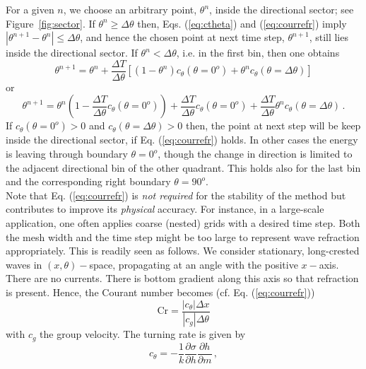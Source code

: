 \documentclass[12pt]{book}
\begin{document}
For a given $n$, we choose an arbitrary point, $\theta^n$, inside the directional sector; see Figure~\ref{fig:sector}.
If $\theta^n \geq \Delta \theta$ then, Eqs. (\ref{eq:ctheta}) and (\ref{eq:courrefr}) imply
$|\theta^{n+1}-\theta^n| \leq \Delta \theta$, and hence the chosen point at next time step, $\theta^{n+1}$, still lies inside the directional sector. If $\theta^n < \Delta \theta$, i.e. in the first bin, then one obtains
\begin{equation}
  \theta^{n+1} = \theta^n + \frac{\Delta T}{\Delta \theta} \left[ (1-\theta^n) c_\theta(\theta=0^o) + \theta^n c_\theta(\theta=\Delta \theta) \right]
\end{equation}
or
\begin{equation}
  \theta^{n+1} = \theta^n \left ( 1 - \frac{\Delta T}{\Delta \theta} c_\theta(\theta=0^o) \right ) + \frac{\Delta T}{\Delta \theta} c_\theta(\theta=0^o) + \frac{\Delta T}{\Delta \theta}
  \theta^n c_\theta(\theta=\Delta \theta) \, .
\end{equation}
If $c_\theta(\theta=0^o) > 0$ and $c_\theta(\theta=\Delta \theta) > 0$ then, the point at next step will be keep inside the directional sector, if Eq. (\ref{eq:courrefr}) holds. In other cases the energy is leaving
through boundary $\theta = 0^o$, though the change in direction is limited to the adjacent directional bin of the other quadrant.
This holds also for the last bin and the corresponding right boundary $\theta = 90^o$.
\\[2ex]
Note that Eq. (\ref{eq:courrefr}) is {\em not required} for the stability of the method but contributes to improve its {\em physical} accuracy.
For instance, in a large-scale application, one often applies coarse (nested) grids with
a desired time step. Both the mesh width and the time step might be too large to represent wave refraction appropriately. This is readily seen as follows. We consider stationary, long-crested waves in $(x,\theta)-$space,
propagating at an angle with the positive $x-$axis. There are no currents. There is bottom gradient along this axis so that refraction is present. Hence, the Courant number becomes (cf. Eq. (\ref{eq:courrefr}))
\begin{equation}
  \mbox{Cr} = \frac{|c_\theta| \Delta x}{|c_g|\Delta \theta}
\end{equation}
with $c_g$ the group velocity. The turning rate is given by
\begin{equation}
  c_\theta = -\frac{1}{k} \frac{\partial \sigma}{\partial h}\frac{\partial h}{\partial m}\, ,
  \label{eq:ctheta1}
\end{equation}
\end{document}

